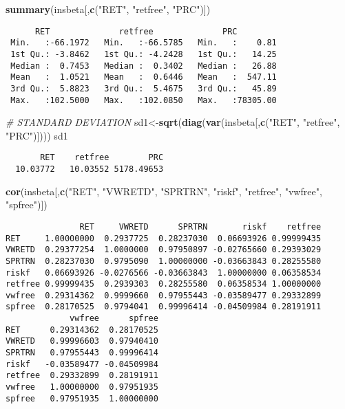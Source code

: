 \documentclass[]{book}
\newenvironment{Shaded}{\begin{snugshade}}{\end{snugshade}}
\newcommand{\CommentTok}[1]{\textcolor[rgb]{0.56,0.35,0.01}{\textit{#1}}}
\newcommand{\KeywordTok}[1]{\textcolor[rgb]{0.13,0.29,0.53}{\textbf{#1}}}
\newcommand{\NormalTok}[1]{#1}
\newcommand{\StringTok}[1]{\textcolor[rgb]{0.31,0.60,0.02}{#1}}
\begin{document}
\begin{Shaded}
\begin{Highlighting}[]
\KeywordTok{summary}\NormalTok{(insbeta[,}\KeywordTok{c}\NormalTok{(}\StringTok{"RET"}\NormalTok{, }\StringTok{"retfree"}\NormalTok{, }\StringTok{"PRC"}\NormalTok{)]) }
\end{Highlighting}
\end{Shaded}

\begin{verbatim}
      RET              retfree              PRC          
 Min.   :-66.1972   Min.   :-66.5785   Min.   :    0.81  
 1st Qu.: -3.8462   1st Qu.: -4.2428   1st Qu.:   14.25  
 Median :  0.7453   Median :  0.3402   Median :   26.88  
 Mean   :  1.0521   Mean   :  0.6446   Mean   :  547.11  
 3rd Qu.:  5.8823   3rd Qu.:  5.4675   3rd Qu.:   45.89  
 Max.   :102.5000   Max.   :102.0850   Max.   :78305.00  
\end{verbatim}

\begin{Shaded}
\begin{Highlighting}[]
\CommentTok{# STANDARD DEVIATION}
\NormalTok{sd1<-}\KeywordTok{sqrt}\NormalTok{(}\KeywordTok{diag}\NormalTok{(}\KeywordTok{var}\NormalTok{(insbeta[,}\KeywordTok{c}\NormalTok{(}\StringTok{"RET"}\NormalTok{, }\StringTok{"retfree"}\NormalTok{, }\StringTok{"PRC"}\NormalTok{)])))}
\NormalTok{sd1}
\end{Highlighting}
\end{Shaded}

\begin{verbatim}
       RET    retfree        PRC 
  10.03772   10.03552 5178.49653 
\end{verbatim}

\begin{Shaded}
\begin{Highlighting}[]
\KeywordTok{cor}\NormalTok{(insbeta[,}\KeywordTok{c}\NormalTok{(}\StringTok{"RET"}\NormalTok{, }\StringTok{"VWRETD"}\NormalTok{, }\StringTok{"SPRTRN"}\NormalTok{, }\StringTok{"riskf"}\NormalTok{, }\StringTok{"retfree"}\NormalTok{, }\StringTok{"vwfree"}\NormalTok{, }\StringTok{"spfree"}\NormalTok{)])}
\end{Highlighting}
\end{Shaded}

\begin{verbatim}
               RET     VWRETD      SPRTRN       riskf    retfree
RET     1.00000000  0.2937725  0.28237030  0.06693926 0.99999435
VWRETD  0.29377254  1.0000000  0.97950897 -0.02765660 0.29393029
SPRTRN  0.28237030  0.9795090  1.00000000 -0.03663843 0.28255580
riskf   0.06693926 -0.0276566 -0.03663843  1.00000000 0.06358534
retfree 0.99999435  0.2939303  0.28255580  0.06358534 1.00000000
vwfree  0.29314362  0.9999660  0.97955443 -0.03589477 0.29332899
spfree  0.28170525  0.9794041  0.99996414 -0.04509984 0.28191911
             vwfree      spfree
RET      0.29314362  0.28170525
VWRETD   0.99996603  0.97940410
SPRTRN   0.97955443  0.99996414
riskf   -0.03589477 -0.04509984
retfree  0.29332899  0.28191911
vwfree   1.00000000  0.97951935
spfree   0.97951935  1.00000000
\end{verbatim}
\end{document}
